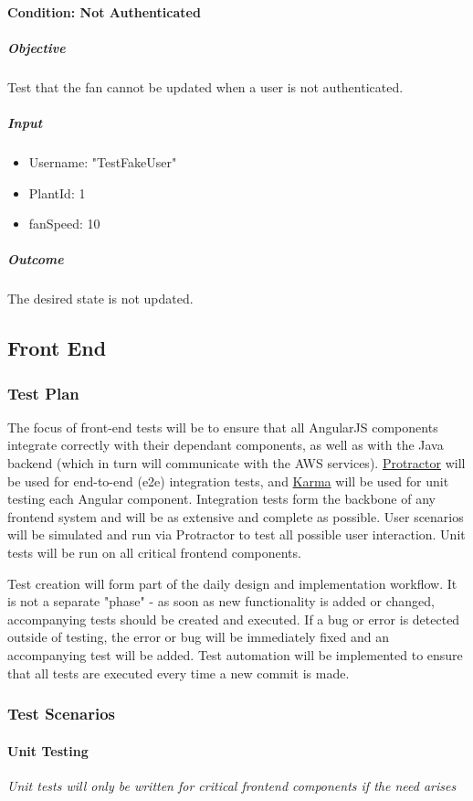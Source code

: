 \documentclass{article}
\begin{document}
	\paragraph{Condition: Not Authenticated}
	\subparagraph{Objective}
	Test that the fan cannot be updated when a user is not authenticated.
	\subparagraph{Input}
	\begin{itemize}
		\item Username: "TestFakeUser"
		\item PlantId: 1
		\item fanSpeed: 10
	\end{itemize}
	
	\subparagraph{Outcome}
	The desired state is not updated.
	
	\subsection{Front End}
		\subsubsection{Test Plan}
		The focus of front-end tests will be to ensure that all AngularJS components integrate correctly with their dependant components, as well as with the Java backend (which in turn will communicate with the AWS services). \href{http://www.protractortest.org/#/}{Protractor} will be used for end-to-end (e2e) integration tests, and \href{https://karma-runner.github.io/1.0/index.html}{Karma} will be used for unit testing each Angular component. Integration tests form the backbone of any frontend system and will be as extensive and complete as possible. User scenarios will be simulated and run via Protractor to test all possible user interaction. Unit tests will be run on all critical frontend components.
		
		Test creation will form part of the daily design and implementation workflow. It is not a separate "phase" - as soon as new functionality is added or changed, accompanying tests should be created and executed. If a bug or error is detected outside of testing, the error or bug will be immediately fixed and an accompanying test will be added. Test automation will be implemented to ensure that all tests are executed every time a new commit is made. 
			
		\subsubsection{Test Scenarios}
			\paragraph{Unit Testing}
				\textit{Unit tests will only be written for critical frontend components if the need arises}
\end{document}
